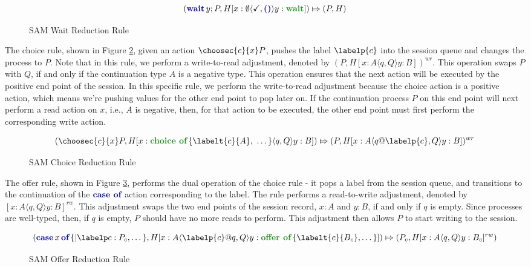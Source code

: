 \begin{figure}[H]
    \centering
    $$
        (\waitc{y}P, H[x:\emptyset\langle\checkmark, \emptyp\rangle y:\waitt])
        \Mapsto
        (P,H)
    $$
    \caption{SAM Wait Reduction Rule}
    \label{fig:SAMWaitRule}
\end{figure}

The choice rule, shown in Figure \ref{fig:SAMChoiceRule}, given an action $\choosec{c}{x}P$, pushes the label $\labelp{c}$ into the session queue and changes the process to $P$. Note that in this rule, we perform a write-to-read adjustment, denoted by $(P,H[x:A\langle q,Q\rangle y:B])^{wr}$. This operation swaps $P$ with $Q$, if and only if the continuation type $A$ is a negative type. This operation ensures that the next action will be executed by the positive end point of the session. In this specific rule, we perform the write-to-read adjustment because the choice action is a positive action, which means we're pushing values for the other end point to pop later on. If the continuation process $P$ on this end point will next perform a read action on $x$, i.e., $A$ is negative, then, for that action to be executed, the other end point must first perform the corresponding write action.

\begin{figure}[H]
    \centering
    $$
        (\choosec{c}{x}P, H[x:\choicet{\labelt{c}{A},\ \dots}\langle q, Q\rangle y:B])
        \Mapsto
        (P,H[x:A\langle q@\labelp{c}, Q\rangle y:B])^{wr}
    $$
    \caption{SAM Choice Reduction Rule}
    \label{fig:SAMChoiceRule}
\end{figure}

The offer rule, shown in Figure \ref{fig:SAMOfferRule}, performs the dual operation of the choice rule - it pops a label from the session queue, and transitions to the continuation of the $\casep$ action corresponding to the label. The rule performs a read-to-write adjustment, denoted by $[x:A\langle q, Q\rangle y:B]^{rw}$. This adjustment swaps the two end points of the session record, $x:A$ and $y:B$, if and only if $q$ is empty. Since processes are well-typed, then, if $q$ is empty, $P$ should have no more reads to perform. This adjustment then allows $P$ to start writing to the session.

\begin{figure}[H]
    \centering
    $$
        (\casec{x}{\labelc{c}{P_c},\dots}, H[x:A\langle \labelp{c}@q, Q\rangle y:\offert{\labelt{c}{B_c},\dots}])
        \Mapsto
        (P_c,H[x:A\langle q, Q\rangle y:B_c]^{rw})
    $$
    \caption{SAM Offer Reduction Rule}
    \label{fig:SAMOfferRule}
\end{figure}

